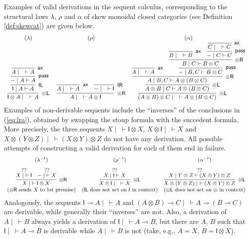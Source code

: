 \documentclass[copyright,creativecommons]{eptcs}
\theoremstyle{definition}
\newcommand{\tl}{\otimes \mathsf{L}}
\newcommand{\tr}{\otimes \mathsf{R}}
\newcommand{\pass}{\mathsf{pass}}
\newcommand{\unitl}{\mathsf{IL}}
\newcommand{\unitr}{\mathsf{IR}}
\newcommand{\ax}{\mathsf{ax}}
\newcommand{\ot}{\otimes}
\newcommand{\lolli}{\multimap}
\newcommand{\I}{\mathsf{I}}
\begin{document}
Examples of valid derivations in the sequent calculus, corresponding to the structural laws $\lambda$, $\rho$ and $\alpha$ of skew monoidal closed categories (see Definition \ref{def:skewcat}) are given below.
\begin{equation}\label{eq:lra}
\small
  \begin{array}{c@{\;\quad}cc}
  (\lambda) & (\rho) & (\alpha) \\
  \infer[\tl]{\I \ot A \mid \quad \vdash A}{
    \infer[\unitl]{\I \mid A \vdash A}{
      \infer[\pass]{{-} \mid A \vdash A}{
        \infer[\ax]{A \mid \quad \vdash A}{}
      }
    }
  }
  &
  \infer[\tr]{A \mid \quad \vdash A \ot \I}{
    \infer[\ax]{A \mid \quad \vdash A}{}
    &
    \infer[\unitr]{{-} \mid \quad \vdash \I}{}
  }
  &
  \infer[\tl]{(A \ot B) \ot C \mid \quad \vdash A \ot (B \ot C)}{
    \infer[\tl]{A \ot B \mid C \vdash A \ot (B \ot C)}{
      \infer[\tr]{A \mid B , C \vdash A \ot (B \ot C)}{
        \infer[\ax]{A \mid \quad \vdash A}{}
        &
        \infer[\pass]{{-} \mid B , C \vdash B \ot C}{
          \infer[\tr]{B \mid C \vdash B \ot C}{
            \infer[\ax]{B \mid \quad \vdash B}{}
            &
            \infer[\pass]{{-} \mid C \vdash C}{
              \infer[\ax]{C \mid \quad \vdash C}{}
            }
          }
        }
      }
    }
  }
  \end{array}
\end{equation}
Examples of non-derivable sequents include the ``inverses'' of the conclusions in (\ref{eq:lra}), obtained by swapping the stoup formula with the succedent formula.
More precisely, the three sequents $X \mid ~ \vdash \I \ot X$, $X \ot \I \mid ~ \vdash X$ and $X \ot (Y \ot Z) \mid ~ \vdash (X \ot Y) \ot Z$ do not have any derivation. All possible attempts of constructing a valid derivation for each of them end in failure.
\begin{displaymath}
\small
  \begin{array}{ccc}
  (\lambda^{-1}) & (\rho^{-1}) & (\alpha^{-1}) \\[6pt]
    \infer[\tr]{X \mid ~\vdash \I \ot X}{
      \deduce[??]{X \mid ~ \vdash \I}{
      }
      &
      \deduce[??]{{-} \mid ~ \vdash X}{
      }
    }
    &
    \infer[\tl]{X \ot \I \mid \quad \vdash X}{
      \deduce{X \mid \I \vdash X}{??}
    }
    &
    \infer[\tl]{X \ot (Y \ot Z) \mid ~\vdash (X \ot Y) \ot Z}{
      \deduce{X \mid Y \ot Z \vdash (X \ot Y) \ot Z}{??}
    } \\
    (\text{$\tr$ sends $X$ to 1st premise}) &
    (\text{$\unitl$ does not act on $\I$ in context}) &
    (\text{$\tl$ does not act on $\ot$ in context})
  \end{array}
\end{displaymath}
Analogously, the sequents $\I \lolli A \mid ~ \vdash A$ and $(A \ot B) \lolli C \mid ~ \vdash A \lolli (B \lolli C)$ are derivable, while generally their ``inverses'' are not. Also, a derivation of $A \mid ~ \vdash B$ always yields a derivation of $\I \mid ~ \vdash A \lolli B$, but there are $A$, $B$ such that $\I \mid ~ \vdash A \lolli B$ is derivable while  $A \mid ~ \vdash B$ is not (take, e.g., $A = X$, $B = \I \ot X$).
\end{document}
